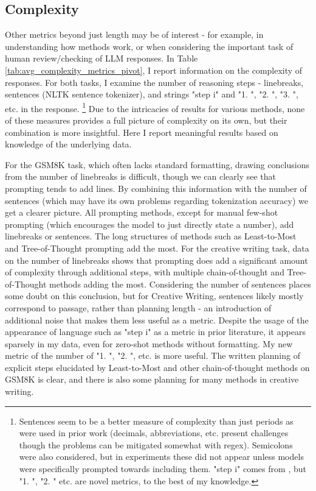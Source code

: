 \documentclass[11pt]{article}
\begin{document}

\subsection*{Complexity}

Other metrics beyond just length may be of interest - for example, in understanding how methods work, or when considering the important task of human review/checking of LLM responses. In Table \ref{tab:avg_complexity_metrics_pivot}, I report information on the complexity of responses. For both tasks, I examine the number of reasoning steps - linebreaks, sentences (NLTK sentence tokenizer), and strings "step i" \cite{fu_complexity-based_2023} and "1. ", "2. ", "3. ", etc. in the response. \footnote{Sentences seem to be a better measure of complexity than just periods as were used in prior work (decimals, abbreviations, etc. present challenges though the problems can be mitigated somewhat with regex). Semicolons were also considered, but in experiments these did not appear unless models were specifically prompted towards including them. "step i" comes from \citealp{fu_complexity-based_2023}, but "1. ", "2. " etc. are novel metrics, to the best of my knowledge.} Due to the intricacies of results for various methods, none of these measures provides a full picture of complexity on its own, but their combination is more insightful. Here I report meaningful results based on knowledge of the underlying data.

For the GSM8K task, which often lacks standard formatting, drawing conclusions from the number of linebreaks is difficult, though we can clearly see that prompting tends to add lines. By combining this information with the number of sentences (which may have its own problems regarding tokenization accuracy) we get a clearer picture. All prompting methods, except for manual few-shot prompting (which encourages the model to just directly state a number), add linebreaks or sentences. The long structures of methods such as Least-to-Most and Tree-of-Thought prompting add the most. For the creative writing task, data on the number of linebreaks shows that prompting does add a significant amount of complexity through additional steps, with multiple chain-of-thought and Tree-of-Thought methods adding the most. Considering the number of sentences places some doubt on this conclusion, but for Creative Writing, sentences likely mostly correspond to passage, rather than planning length - an introduction of additional noise that makes them less useful as a metric. Despite the usage of the appearance of language such as "step i" as a metric in prior literature, it appears sparsely in my data, even for zero-shot methods without formatting. My new metric of the number of "1. ", "2. ", etc. is more useful. The written planning of explicit steps elucidated by Least-to-Most and other chain-of-thought methods on GSM8K is clear, and there is also some planning for many methods in creative writing.
\end{document}
